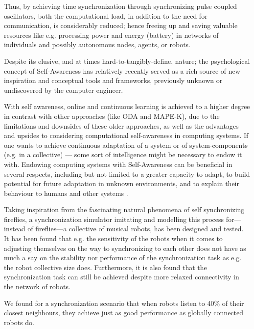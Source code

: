 Thus, by achieving time synchronization \cite{tungvinte_sync_protocols} through synchronizing pulse coupled oscillators, both the computational load, in addition to the need for communication, is considerably reduced; hence freeing up and saving valuable resources like e.g. processing power and energy (battery) in networks of individuals and possibly autonomous nodes, agents, or robots.

Despite its elusive, and at times hard-to-tangibly-define, nature; the psychological concept of Self-Awareness has relatively recently served as a rich source of new inspiration and conceptual tools and frameworks, previously unknown or undiscovered by the computer engineer.

With self awareness, online and continuous learning is achieved to a higher degree in contrast with other approaches (like ODA and MAPE-K), due to the limitations and downsides of these older approaches, as well as the advantages and upsides to considering computational self-awareness in computing systems. If one wants to achieve continuous adaptation of a system or of system-components (e.g. in a collective) — some sort of intelligence might be necessary to endow it with. Endowing computing systems with Self-Awareness can be beneficial in several respects, including but not limited to a greater capacity to adapt, to build potential for future adaptation in unknown environments, and to explain their behaviour to humans and other systems \cite{sacs17_ch3}.

Taking inspiration from the fascinating natural phenomena of self synchronizing fireflies, a synchronization simulator imitating and modelling this process for—instead of fireflies—a collective of musical robots, has been designed and tested. It has been found that e.g. the sensitivity of the robots when it comes to adjusting themselves on the way to synchronizing to each other does not have as much a say on the stability nor performance of the synchronization task as e.g. the robot collective size does. Furthermore, it is also found that the synchronization task can still be achieved despite more relaxed connectivity in the network of robots.

We found for a synchronization scenario that when robots listen to 40\% of their closest neighbours, they achieve just as good performance as globally connected robots do.